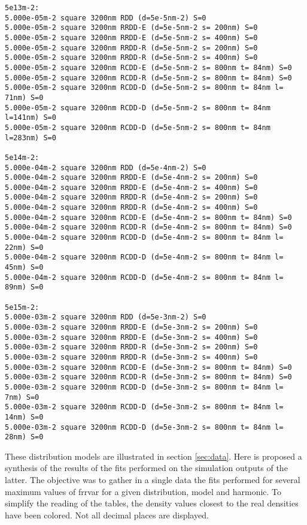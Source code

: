 \begin{tcolorbox}
\begin{verbatim}
5e13m-2:
5.000e-05m-2 square 3200nm RDD (d=5e-5nm-2) S=0
5.000e-05m-2 square 3200nm RRDD-E (d=5e-5nm-2 s= 200nm) S=0
5.000e-05m-2 square 3200nm RRDD-E (d=5e-5nm-2 s= 400nm) S=0
5.000e-05m-2 square 3200nm RRDD-R (d=5e-5nm-2 s= 200nm) S=0
5.000e-05m-2 square 3200nm RRDD-R (d=5e-5nm-2 s= 400nm) S=0
5.000e-05m-2 square 3200nm RCDD-E (d=5e-5nm-2 s= 800nm t= 84nm) S=0
5.000e-05m-2 square 3200nm RCDD-R (d=5e-5nm-2 s= 800nm t= 84nm) S=0
5.000e-05m-2 square 3200nm RCDD-D (d=5e-5nm-2 s= 800nm t= 84nm l= 71nm) S=0
5.000e-05m-2 square 3200nm RCDD-D (d=5e-5nm-2 s= 800nm t= 84nm l=141nm) S=0
5.000e-05m-2 square 3200nm RCDD-D (d=5e-5nm-2 s= 800nm t= 84nm l=283nm) S=0

5e14m-2:
5.000e-04m-2 square 3200nm RDD (d=5e-4nm-2) S=0
5.000e-04m-2 square 3200nm RRDD-E (d=5e-4nm-2 s= 200nm) S=0
5.000e-04m-2 square 3200nm RRDD-E (d=5e-4nm-2 s= 400nm) S=0
5.000e-04m-2 square 3200nm RRDD-R (d=5e-4nm-2 s= 200nm) S=0
5.000e-04m-2 square 3200nm RRDD-R (d=5e-4nm-2 s= 400nm) S=0
5.000e-04m-2 square 3200nm RCDD-E (d=5e-4nm-2 s= 800nm t= 84nm) S=0
5.000e-04m-2 square 3200nm RCDD-R (d=5e-4nm-2 s= 800nm t= 84nm) S=0
5.000e-04m-2 square 3200nm RCDD-D (d=5e-4nm-2 s= 800nm t= 84nm l= 22nm) S=0
5.000e-04m-2 square 3200nm RCDD-D (d=5e-4nm-2 s= 800nm t= 84nm l= 45nm) S=0
5.000e-04m-2 square 3200nm RCDD-D (d=5e-4nm-2 s= 800nm t= 84nm l= 89nm) S=0

5e15m-2:
5.000e-03m-2 square 3200nm RDD (d=5e-3nm-2) S=0
5.000e-03m-2 square 3200nm RRDD-E (d=5e-3nm-2 s= 200nm) S=0
5.000e-03m-2 square 3200nm RRDD-E (d=5e-3nm-2 s= 400nm) S=0
5.000e-03m-2 square 3200nm RRDD-R (d=5e-3nm-2 s= 200nm) S=0
5.000e-03m-2 square 3200nm RRDD-R (d=5e-3nm-2 s= 400nm) S=0
5.000e-03m-2 square 3200nm RCDD-E (d=5e-3nm-2 s= 800nm t= 84nm) S=0
5.000e-03m-2 square 3200nm RCDD-R (d=5e-3nm-2 s= 800nm t= 84nm) S=0
5.000e-03m-2 square 3200nm RCDD-D (d=5e-3nm-2 s= 800nm t= 84nm l=  7nm) S=0
5.000e-03m-2 square 3200nm RCDD-D (d=5e-3nm-2 s= 800nm t= 84nm l= 14nm) S=0
5.000e-03m-2 square 3200nm RCDD-D (d=5e-3nm-2 s= 800nm t= 84nm l= 28nm) S=0
\end{verbatim}
\end{tcolorbox}

\bigskip

These distribution models are illustrated in section \ref{sec:data}.
Here is proposed a synthesis of the results of the fits performed on the simulation outputs of the latter.
The objective was to gather in a single data the fits performed for several maximum values of \gls{frrvar} for a given distribution, model and harmonic.
To simplify the reading of the tables, the density values closest to the real densities have been colored.
Not all decimal places are displayed.

